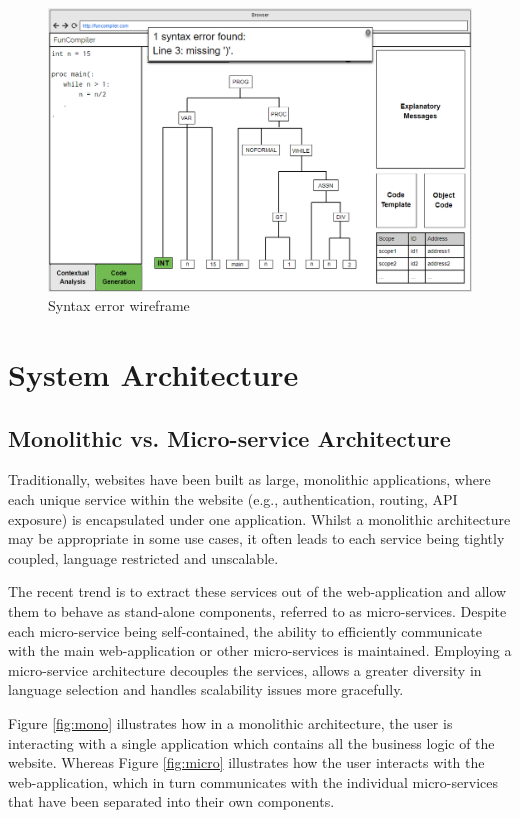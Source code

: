 \documentclass{l4proj}
\begin{document}
 \begin{figure}[h]
\centering
\includegraphics[scale=0.4]{images/syntax-error-wireframe.png}
\caption{Syntax error wireframe}
\label{fig:syntax-error-wireframe}	
\end{figure}

\chapter{System Architecture}
\section{Monolithic vs. Micro-service Architecture}
Traditionally, websites have been built as large, monolithic applications, where each unique service within the website (e.g., authentication, routing, API exposure) is encapsulated under one application. Whilst a monolithic architecture may be appropriate in some use cases, it often leads to each service being tightly coupled, language restricted and unscalable. 

The recent trend is to extract these services out of the web-application and allow them to behave as stand-alone components, referred to as micro-services. Despite each micro-service being self-contained, the ability to efficiently communicate with the main web-application or other micro-services is maintained. Employing a micro-service architecture decouples the services, allows a greater diversity in language selection and handles scalability issues more gracefully. 

Figure \ref{fig:mono} illustrates how in a monolithic architecture, the user is interacting with a single application which contains all the business logic of the website. Whereas Figure \ref{fig:micro} illustrates how the user interacts with the web-application, which in turn communicates with the individual micro-services that have been separated into their own components.
\end{document}
